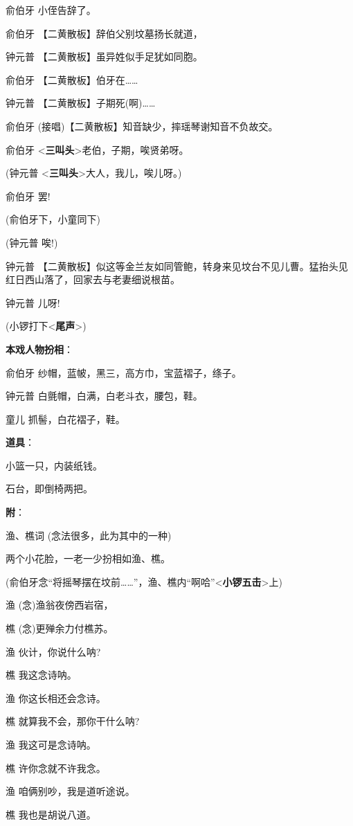 俞伯牙 小侄告辞了。

俞伯牙 【二黄散板】辞伯父别坟墓扬长就道，

钟元普 【二黄散板】虽异姓似手足犹如同胞。

俞伯牙 【二黄散板】伯牙在\ldots{}\ldots{}

钟元普 【二黄散板】子期死(啊)\ldots{}\ldots{}

俞伯牙 (接唱)【二黄散板】知音缺少，摔瑶琴谢知音不负故交。

俞伯牙 \textless{}\textbf{三叫头}\textgreater{}老伯，子期，唉贤弟呀。

(钟元普 \textless{}\textbf{三叫头}\textgreater{}大人，我儿，唉儿呀。)

俞伯牙 罢!

(俞伯牙下，小童同下)

(钟元普 唉!)

钟元普
【二黄散板】似这等金兰友如同管鲍，转身来见坟台不见儿曹。猛抬头见红日西山落了，回家去与老妻细说根苗。

钟元普 儿呀!

(小锣打下\textless{}\textbf{尾声}\textgreater{})

\textbf{本戏人物扮相}：

俞伯牙 纱帽，蓝帔，黑三，高方巾，宝蓝褶子，绦子。

钟元普 白氈帽，白满，白老斗衣，腰包，鞋。

童儿 抓髻，白花褶子，鞋。

\textbf{道具}：

小篮一只，内装纸钱。

石台，即倒椅两把。

\textbf{附}：

渔、樵词 (念法很多，此为其中的一种)

两个小花脸，一老一少扮相如渔、樵。

(俞伯牙念``将摇琴摆在坟前\ldots{}\ldots{}''，渔、樵内``啊哈''\textless{}\textbf{小锣五击}\textgreater{}上)

渔 (念)渔翁夜傍西岩宿，

樵 (念)更殚余力付樵苏。

渔 伙计，你说什么呐?

樵 我这念诗呐。

渔 你这长相还会念诗。

樵 就算我不会，那你干什么呐?

渔 我这可是念诗呐。

樵 许你念就不许我念。

渔 咱俩别吵，我是道听途说。

樵 我也是胡说八道。

